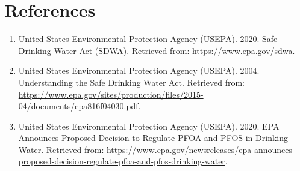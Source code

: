 \documentclass[12pt,]{article}
\providecommand{\tightlist}{%
  \setlength{\itemsep}{0pt}\setlength{\parskip}{0pt}}
\begin{document}
\newpage

\hypertarget{references}{%
\section{References}\label{references}}

\begin{enumerate}
\def\labelenumi{\arabic{enumi}.}
\tightlist
\item
  United States Environmental Protection Agency (USEPA). 2020. Safe
  Drinking Water Act (SDWA). Retrieved from:
  \url{https://www.epa.gov/sdwa}.
\item
  United States Environmental Protection Agency (USEPA). 2004.
  Understanding the Safe Drinking Water Act. Retrieved from:
  \url{https://www.epa.gov/sites/production/files/2015-04/documents/epa816f04030.pdf}.
\item
  United States Environmental Protection Agency (USEPA). 2020. EPA
  Announces Proposed Decision to Regulate PFOA and PFOS in Drinking
  Water. Retrieved from:
  \url{https://www.epa.gov/newsreleases/epa-announces-proposed-decision-regulate-pfoa-and-pfos-drinking-water}.
\end{enumerate}
\end{document}
